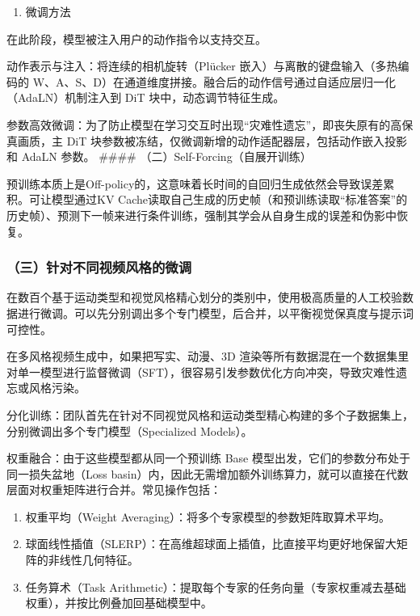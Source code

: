 \begin{enumerate}
\def\labelenumi{\arabic{enumi}.}
\setcounter{enumi}{1}
\tightlist
\item
  微调方法
\end{enumerate}

在此阶段，模型被注入用户的动作指令以支持交互。

动作表示与注入：将连续的相机旋转（Plücker 嵌入）与离散的键盘输入（多热编码的 W、A、S、D）在通道维度拼接。融合后的动作信号通过自适应层归一化（AdaLN）机制注入到 DiT 块中，动态调节特征生成。

参数高效微调：为了防止模型在学习交互时出现``灾难性遗忘''，即丧失原有的高保真画质，主 DiT 块参数被冻结，仅微调新增的动作适配器层，包括动作嵌入投影和 AdaLN 参数。
\#\#\#\# （二）Self-Forcing（自展开训练）

预训练本质上是Off-policy的，这意味着长时间的自回归生成依然会导致误差累积。可让模型通过KV Cache读取自己生成的历史帧（和预训练读取``标准答案''的历史帧）、预测下一帧来进行条件训练，强制其学会从自身生成的误差和伪影中恢复。

\hypertarget{ux4e09ux9488ux5bf9ux4e0dux540cux89c6ux9891ux98ceux683cux7684ux5faeux8c03}{%
\subsubsection{（三）针对不同视频风格的微调}\label{ux4e09ux9488ux5bf9ux4e0dux540cux89c6ux9891ux98ceux683cux7684ux5faeux8c03}}

在数百个基于运动类型和视觉风格精心划分的类别中，使用极高质量的人工校验数据进行微调。可以先分别调出多个专门模型，后合并，以平衡视觉保真度与提示词可控性。

在多风格视频生成中，如果把写实、动漫、3D 渲染等所有数据混在一个数据集里对单一模型进行监督微调（SFT），很容易引发参数优化方向冲突，导致灾难性遗忘或风格污染。

分化训练：团队首先在针对不同视觉风格和运动类型精心构建的多个子数据集上，分别微调出多个专门模型（Specialized Models）。

权重融合：由于这些模型都从同一个预训练 Base 模型出发，它们的参数分布处于同一损失盆地（Loss basin）内，因此无需增加额外训练算力，就可以直接在代数层面对权重矩阵进行合并。常见操作包括：

\begin{enumerate}
\def\labelenumi{\arabic{enumi}.}
\item
  权重平均（Weight Averaging）：将多个专家模型的参数矩阵取算术平均。
\item
  球面线性插值（SLERP）：在高维超球面上插值，比直接平均更好地保留大矩阵的非线性几何特征。
\item
  任务算术（Task Arithmetic）：提取每个专家的任务向量（专家权重减去基础权重），并按比例叠加回基础模型中。
\end{enumerate}


